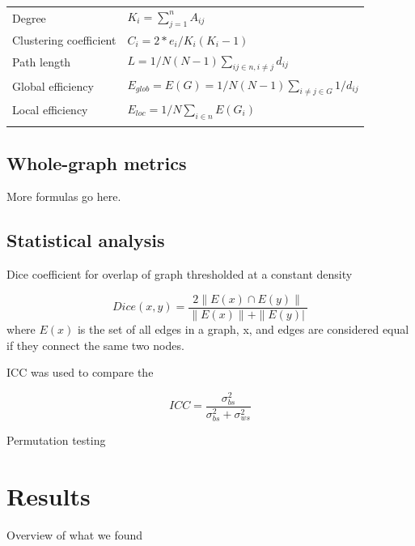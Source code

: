 \documentclass{frontiersSCNS} %
\begin{document}
\begin{table}[!t]
{\begin{tabular}{ll}
\midrule
Degree & $K_i = \sum_{j=1}^{n}{A_{ij}}$\\
Clustering coefficient & $C_i = 2*e_i / K_i ( K_i -1 )$\\
Path length & $L = 1/N(N-1) \sum_{ij \in n, i \neq j}{d_{ij}}$\\
Global efficiency & $E_{glob} = E(G) = 1/N(N-1) \sum_{i \neq j \in G}{1/d_{ij}}$\\
Local efficiency & $E_{loc} = 1/N \sum_{i \in n}{E(G_i)}$\\\botrule
\end{tabular}}{}
\end{table}

\subsection{Whole-graph metrics}
More formulas go here.

\subsection{Statistical analysis}
Dice coefficient for overlap of graph thresholded at a constant
density

$$Dice(x,y) = \frac{ 2 \| E(x) \cap E(y) \| }{ \|E(x) \| + \| E(y) |\ }$$
where $E(x)$ is the set of all edges in a graph, x, and edges are considered equal if they connect the same two nodes.

ICC was used to compare the

$$ICC = \frac{\sigma_{bs}^{2}}{\sigma_{bs}^{2} + \sigma_{ws}^{2}} $$

Permutation testing



\section{Results}
Overview of what we found
\end{document}
